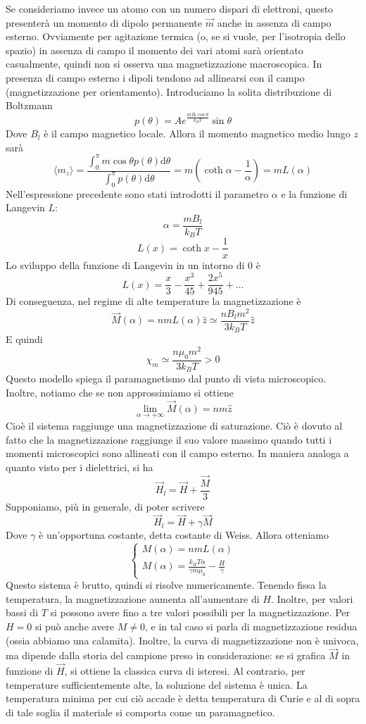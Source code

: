 \documentclass[a4paper,11pt]{book}
\newcommand{\dif}{\mathrm{d}}
\theoremstyle{definition}
\theoremstyle{theorem}
\begin{document}
Se consideriamo invece un atomo con un numero dispari di elettroni, questo presenterà un momento di dipolo permanente $\vec{m}$ anche in assenza di campo esterno. Ovviamente per agitazione termica (o, se si vuole, per l'isotropia dello spazio) in assenza di campo il momento dei vari atomi sarà orientato casualmente, quindi non si osserva una magnetizzazione macroscopica. In presenza di campo esterno i dipoli tendono ad allinearsi con il campo (magnetizzazione per orientamento). Introduciamo la solita distribuzione di Boltzmann
\[p(\theta)=Ae^{\frac{mB_{l}\cos\theta}{k_BT}}\sin\theta\]
Dove $B_l$ è il campo magnetico locale. Allora il momento magnetico medio lungo $z$ sarà
\[\langle m_z\rangle=\frac{\int_{0}^{\pi}m\cos\theta p(\theta)\dif\theta}{\int_{0}^{\pi}p(\theta)\dif\theta}=m\left(\coth\alpha-\frac{1}{\alpha}\right)=mL(\alpha)\]
Nell'espressione precedente sono stati introdotti il parametro $\alpha$ e la funzione di Langevin $L$:
\[\alpha=\frac{mB_l}{k_BT}\]
\[L(x)=\coth x-\frac{1}{x}\]
Lo sviluppo della funzione di Langevin in un intorno di 0 è
\[L(x)=\frac{x}{3}-\frac{x^3}{45}+\frac{2x^5}{945}+\dots\]
Di conseguenza, nel regime di alte temperature la magnetizzazione è
\[\vec{M}(\alpha)=nmL(\alpha)\hat{z}\simeq \frac{nB_lm^2}{3k_BT}\hat{z}\]
E quindi
\[\chi_m\simeq\frac{n\mu_0m^2}{3k_BT}>0\]
Questo modello spiega il paramagnetismo dal punto di vista microscopico. Inoltre, notiamo che se non approssimiamo si ottiene
\[\lim\limits_{\alpha\to+\infty}\vec{M}(\alpha)=nm\hat{z}\]
Cioè il sistema raggiunge una magnetizzazione di saturazione. Ciò è dovuto al fatto che la magnetizzazione raggiunge il suo valore massimo quando tutti i momenti microscopici sono allineati con il campo esterno.
In maniera analoga a quanto visto per i dielettrici, si ha
\[\vec{H}_l=\vec{H}+\frac{\vec{M}}{3}\]
Supponiamo, più in generale, di poter scrivere 
\[\vec{H}_l=\vec{H}+\gamma\vec{M}\]
Dove $\gamma$ è un'opportuna costante, detta costante di Weiss. Allora otteniamo
\[\left\{\begin{array}{l}
M(\alpha)=nmL(\alpha)\\
M(\alpha)=\frac{k_BT\alpha}{\gamma m\mu_0}-\frac{H}{\gamma}
\end{array}\right.\]
Questo sistema è brutto, quindi si risolve numericamente. Tenendo fissa la temperatura, la magnetizzazione aumenta all'aumentare di $H$. Inoltre, per valori bassi di $T$ si possono avere fino a tre valori possibili per la magnetizzazione. Per $H=0$ si può anche avere $M\neq0$, e in tal caso si parla di magnetizzazione residua (ossia abbiamo una calamita). Inoltre, la curva di magnetizzazione non è univoca, ma dipende dalla storia del campione preso in considerazione: se si grafica $\vec{M}$ in funzione di $\vec{H}$, si ottiene la classica curva di isteresi. Al contrario, per temperature sufficientemente alte, la soluzione del sistema è unica. La temperatura minima per cui ciò accade è detta temperatura di Curie e al di sopra di tale soglia il materiale si comporta come un paramagnetico. 
\end{document}
